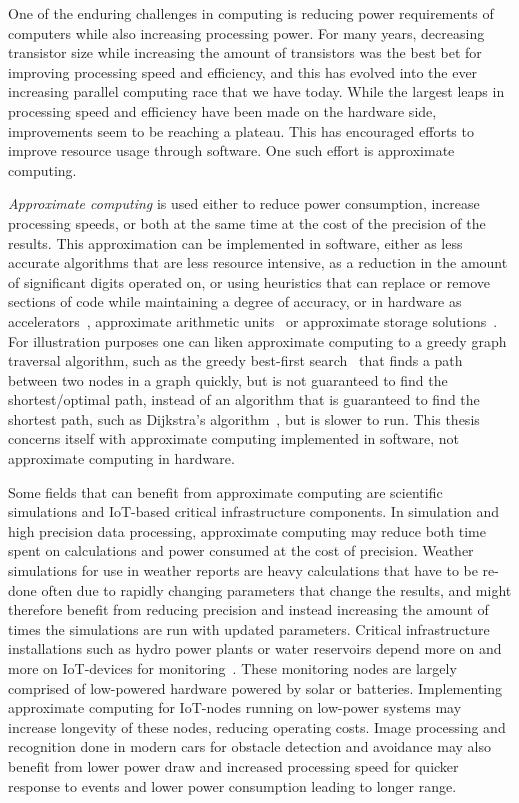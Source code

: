 


One of the enduring challenges in computing is reducing power requirements of computers while also increasing processing power. For many years, decreasing transistor size while increasing the amount of transistors was the best bet for improving processing speed and efficiency, and this has evolved into the ever increasing parallel computing race that we have today. While the largest leaps in processing speed and efficiency have been made on the hardware side, improvements seem to be reaching a plateau. This has encouraged efforts to improve resource usage through software. One such effort is approximate computing. 

\emph{Approximate computing} is used either to reduce power consumption, increase processing speeds, or both at the same time at the cost of the precision of the results. This approximation can be implemented in software, either as less accurate algorithms that are less resource intensive, as a reduction in the amount of significant digits operated on, or using heuristics that can replace or remove sections of code while maintaining a degree of accuracy, or in hardware as accelerators~\citep{moreau2015snnap}, approximate arithmetic units~\citep{han2013approximate} or approximate storage solutions~\citep{nguyen2020approximate}. For illustration purposes one can liken approximate computing to a greedy graph traversal algorithm, such as the greedy best-first search~\citep{coles2007marvin} that finds a path between two nodes in a graph quickly, but is not guaranteed to find the shortest/optimal path, instead of an algorithm that is guaranteed to find the shortest path, such as Dijkstra's algorithm~\citep{dijkstra1959note}, but is slower to run. This thesis concerns itself with approximate computing implemented in software, not approximate computing in hardware. 

Some fields that can benefit from approximate computing are scientific simulations and IoT-based critical infrastructure components. In simulation and high precision data processing, approximate computing may reduce both time spent on calculations and power consumed at the cost of precision. Weather simulations for use in weather reports are heavy calculations that have to be re-done often due to rapidly changing parameters that change the results, and might therefore benefit from reducing precision and instead increasing the amount of times the simulations are run with updated parameters. Critical infrastructure installations such as hydro power plants or water reservoirs depend more on and more on IoT-devices for monitoring~\citep{watertight_jaatun}. These monitoring nodes are largely comprised of low-powered hardware powered by solar or batteries. Implementing approximate computing for IoT-nodes running on low-power systems may increase longevity of these nodes, reducing operating costs. Image processing and recognition done in modern cars for obstacle detection and avoidance may also benefit from lower power draw and increased processing speed for quicker response to events and lower power consumption leading to longer range. %

